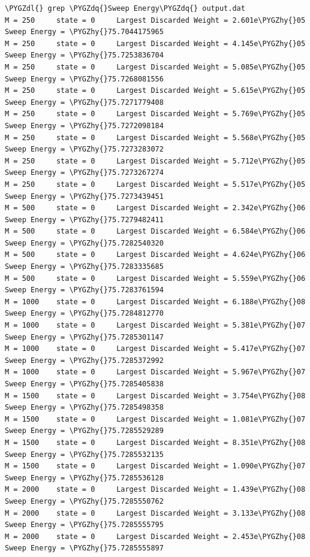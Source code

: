 \documentclass[letterpaper,10pt,english]{sphinxmanual}
\def\PYGZdl{\char`\$}
\def\PYGZhy{\char`\-}
\def\PYGZdq{\char`\"}
\begin{document}
\begin{Verbatim}[commandchars=\\\{\}]
\PYGZdl{} grep \PYGZdq{}Sweep Energy\PYGZdq{} output.dat
M = 250     state = 0     Largest Discarded Weight = 2.601e\PYGZhy{}05  Sweep Energy = \PYGZhy{}75.7044175965
M = 250     state = 0     Largest Discarded Weight = 4.145e\PYGZhy{}05  Sweep Energy = \PYGZhy{}75.7253836704
M = 250     state = 0     Largest Discarded Weight = 5.085e\PYGZhy{}05  Sweep Energy = \PYGZhy{}75.7268081556
M = 250     state = 0     Largest Discarded Weight = 5.615e\PYGZhy{}05  Sweep Energy = \PYGZhy{}75.7271779408
M = 250     state = 0     Largest Discarded Weight = 5.769e\PYGZhy{}05  Sweep Energy = \PYGZhy{}75.7272098184
M = 250     state = 0     Largest Discarded Weight = 5.568e\PYGZhy{}05  Sweep Energy = \PYGZhy{}75.7273283072
M = 250     state = 0     Largest Discarded Weight = 5.712e\PYGZhy{}05  Sweep Energy = \PYGZhy{}75.7273267274
M = 250     state = 0     Largest Discarded Weight = 5.517e\PYGZhy{}05  Sweep Energy = \PYGZhy{}75.7273439451
M = 500     state = 0     Largest Discarded Weight = 2.342e\PYGZhy{}06  Sweep Energy = \PYGZhy{}75.7279482411
M = 500     state = 0     Largest Discarded Weight = 6.584e\PYGZhy{}06  Sweep Energy = \PYGZhy{}75.7282540320
M = 500     state = 0     Largest Discarded Weight = 4.624e\PYGZhy{}06  Sweep Energy = \PYGZhy{}75.7283335685
M = 500     state = 0     Largest Discarded Weight = 5.559e\PYGZhy{}06  Sweep Energy = \PYGZhy{}75.7283761594
M = 1000    state = 0     Largest Discarded Weight = 6.188e\PYGZhy{}08  Sweep Energy = \PYGZhy{}75.7284812770
M = 1000    state = 0     Largest Discarded Weight = 5.381e\PYGZhy{}07  Sweep Energy = \PYGZhy{}75.7285301147
M = 1000    state = 0     Largest Discarded Weight = 5.417e\PYGZhy{}07  Sweep Energy = \PYGZhy{}75.7285372992
M = 1000    state = 0     Largest Discarded Weight = 5.967e\PYGZhy{}07  Sweep Energy = \PYGZhy{}75.7285405838
M = 1500    state = 0     Largest Discarded Weight = 3.754e\PYGZhy{}08  Sweep Energy = \PYGZhy{}75.7285498358
M = 1500    state = 0     Largest Discarded Weight = 1.081e\PYGZhy{}07  Sweep Energy = \PYGZhy{}75.7285529289
M = 1500    state = 0     Largest Discarded Weight = 8.351e\PYGZhy{}08  Sweep Energy = \PYGZhy{}75.7285532135
M = 1500    state = 0     Largest Discarded Weight = 1.090e\PYGZhy{}07  Sweep Energy = \PYGZhy{}75.7285536128
M = 2000    state = 0     Largest Discarded Weight = 1.439e\PYGZhy{}08  Sweep Energy = \PYGZhy{}75.7285550762
M = 2000    state = 0     Largest Discarded Weight = 3.133e\PYGZhy{}08  Sweep Energy = \PYGZhy{}75.7285555795
M = 2000    state = 0     Largest Discarded Weight = 2.453e\PYGZhy{}08  Sweep Energy = \PYGZhy{}75.7285555897

\end{Verbatim}
\end{document}
